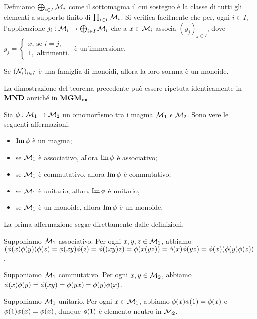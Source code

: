 \Proof Definiamo $\bigoplus_{i \in I} \mathcal{M}_i$ come il sottomagma il cui sostegno \`e la classe di tutti gli elementi a supporto finito di $\prod_{i \in I} \mathcal{M}_i$. Si verifica facilmente che per, ogni $i \in I$, l'applicazione $\Injection_i: \Magma_i \rightarrow \DirectSum_{i \in I} \Magma_i$ che a $x \in \mathcal{M}_i$ associa $(y_j)_{j \in I}$, dove $y_j = \begin{cases} x\text{, se }i = j,\\ 1,\text{ altrimenti}.\end{cases}$ \`e un'immersione. \EndProof
\begin{Corollary}
	Se $(\mathcal{N}_i)_{i \in I}$ \`e una famiglia di monoidi, allora la loro somma \`e un monoide.
\end{Corollary}
\Proof La dimostrazione del teorema precedente pu\`o essere ripetuta identicamente in $\mathbf{MND}$ anzich\'e in $\mathbf{MGM}_{\text{un}}$. \EndProof
\begin{Theorem}
	Sia $\phi: \mathcal{M}_1 \rightarrow \mathcal{M}_2$ un omomorfismo tra i magma $\mathcal{M}_1$ e $\mathcal{M}_2$. Sono vere le seguenti affermazioni:
	\begin{itemize}
		\item $\operatorname{Im}{\phi}$ \`e un magma;
		\item se $\mathcal{M}_1$ \`e associativo, allora $\operatorname{Im}{\phi}$ \`e associativo;
		\item se $\mathcal{M}_1$ \`e commutativo, allora $\operatorname{Im}{\phi}$ \`e commutativo;
		\item se $\mathcal{M}_1$ \`e unitario, allora $\operatorname{Im}{\phi}$ \`e unitario;
		\item se $\mathcal{M}_1$ \`e un monoide, allora $\operatorname{Im}{\phi}$ \`e un monoide.
	\end{itemize}
\end{Theorem}
\Proof La prima affermazione segue direttamente dalle definizioni.
\par Supponiamo $\mathcal{M}_1$ associativo. Per ogni $x,y,z \in \mathcal{M}_1$, abbiamo $(\phi(x)\phi(y))\phi(z) = \phi(xy)\phi(z) = \phi((xy)z) = \phi(x(yz)) = \phi(x)\phi(yz) = \phi(x)(\phi(y)\phi(z))$.
\par Supponiamo $\mathcal{M}_1$ commutativo. Per ogni $x, y \in \mathcal{M}_2$, abbiamo $\phi(x)\phi(y) = \phi(xy) = \phi(yx) = \phi(y)\phi(x)$.
\par Supponiamo $\mathcal{M}_1$ unitario. Per ogni $x \in \mathcal{M}_1$, abbiamo $\phi(x)\phi(1) = \phi(x)$ e $\phi(1)\phi(x) = \phi(x)$, dunque $\phi(1)$ \`e elemento neutro in $\mathcal{M}_2$.
